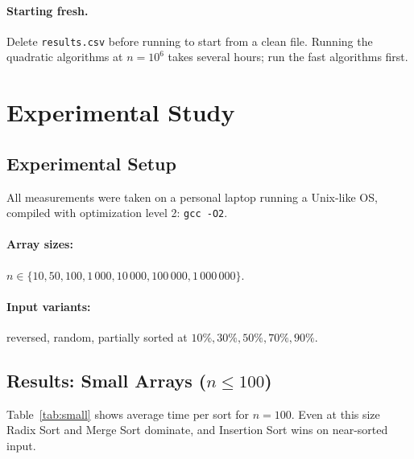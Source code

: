 \documentclass[11pt,a4paper]{article}
\begin{document}
\paragraph{Starting fresh.}
Delete \texttt{results.csv} before running to start from a clean file. Running the quadratic algorithms at $n = 10^6$ takes several hours; run the fast algorithms first.

\section{Experimental Study}
\label{sec:experiment}

\subsection{Experimental Setup}
All measurements were taken on a personal laptop running a Unix-like OS, compiled with optimization level 2: \texttt{gcc -O2}. 
\paragraph{Array sizes:} $n \in \{10, 50, 100, 1\,000, 10\,000, 100\,000, 1\,000\,000\}$. 
\paragraph{Input variants:} reversed, random, partially sorted at $10\%, 30\%, 50\%, 70\%, 90\%$.


\subsection{Results: Small Arrays ($n \leq 100$)}

Table~\ref{tab:small} shows average time per sort for $n = 100$. Even at this size Radix Sort and Merge Sort dominate, and Insertion Sort wins on near-sorted input.
\end{document}

